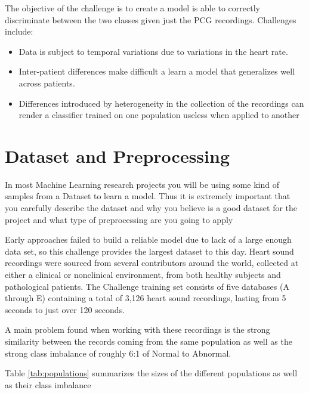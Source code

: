 \documentclass[11pt,letterpaper]{article}
\begin{document}
The objective of the challenge is to create a model is able to correctly discriminate between the two classes given just the PCG recordings. Challenges include:

\begin{itemize}
    \item Data is subject to temporal variations due to variations in the heart rate.
    \item Inter-patient differences make difficult a learn a model that generalizes well across patients.
    \item Differences introduced by heterogeneity in the collection of the recordings can render a classifier trained on one population useless when applied to another
\end{itemize}


\section{Dataset and Preprocessing} %
\label{sec:dataset_and_preprocessing}

\begin{tip}
In most Machine Learning research projects you will be using some kind of samples from a Dataset to learn a model. Thus it is extremely important that you carefully describe the dataset and why you believe is a good dataset for the project and what type of preprocessing are you going to apply
\end{tip}

Early approaches failed to build a reliable model due to lack of a large enough data set, so this challenge provides the largest dataset to this day. Heart sound recordings were sourced from several contributors around the world, collected at either a clinical or nonclinical environment, from both healthy subjects and pathological patients. The Challenge training set consists of five databases (A through E) containing a total of 3,126 heart sound recordings, lasting from 5 seconds to just over 120 seconds.

A main problem found when working with these recordings is the strong similarity between the records coming from the same population  as well as the strong class imbalance of roughly 6:1 of Normal to Abnormal.

Table \ref{tab:populations} summarizes the sizes of the different populations as well as their class imbalance
\end{document}
